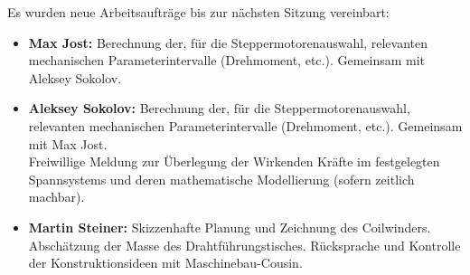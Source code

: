 
Es wurden neue Arbeitsaufträge bis zur nächsten Sitzung vereinbart:

\begin{itemize}
    \item \textbf{Max Jost:} Berechnung der, für die Steppermotorenauswahl, relevanten mechanischen Parameterintervalle (Drehmoment, etc.). Gemeinsam mit Aleksey Sokolov.
    \item \textbf{Aleksey Sokolov:} Berechnung der, für die Steppermotorenauswahl, relevanten mechanischen Parameterintervalle (Drehmoment, etc.). Gemeinsam mit Max Jost.\\
    Freiwillige Meldung zur Überlegung der Wirkenden Kräfte im festgelegten Spannsystems und deren mathematische Modellierung (sofern zeitlich machbar).
    \item \textbf{Martin Steiner:} Skizzenhafte Planung und Zeichnung des Coilwinders. Abschätzung der Masse des Drahtführungstisches. Rücksprache und Kontrolle der Konstruktionsideen mit Maschinebau-Cousin.
\end{itemize}